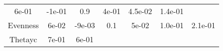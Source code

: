 \documentclass[12pt,]{article}
\begin{document}
\begin{longtable}[]{@{}ccccccc@{}}
\begin{minipage}[t]{0.09\columnwidth}
6e-01\strut
\end{minipage} & \begin{minipage}[t]{0.11\columnwidth}\centering\strut
-1e-01\strut
\end{minipage} & \begin{minipage}[t]{0.08\columnwidth}\centering\strut
0.9\strut
\end{minipage} & \begin{minipage}[t]{0.10\columnwidth}\centering\strut
4e-01\strut
\end{minipage} & \begin{minipage}[t]{0.07\columnwidth}\centering\strut
4.5e-02\strut
\end{minipage} & \begin{minipage}[t]{0.09\columnwidth}\centering\strut
1.4e-01\strut
\end{minipage}\tabularnewline
\begin{minipage}[t]{0.26\columnwidth}\centering\strut
Evenness\strut
\end{minipage} & \begin{minipage}[t]{0.09\columnwidth}\centering\strut
6e-02\strut
\end{minipage} & \begin{minipage}[t]{0.11\columnwidth}\centering\strut
-9e-03\strut
\end{minipage} & \begin{minipage}[t]{0.08\columnwidth}\centering\strut
0.1\strut
\end{minipage} & \begin{minipage}[t]{0.10\columnwidth}\centering\strut
5e-02\strut
\end{minipage} & \begin{minipage}[t]{0.07\columnwidth}\centering\strut
1.0e-01\strut
\end{minipage} & \begin{minipage}[t]{0.09\columnwidth}\centering\strut
2.1e-01\strut
\end{minipage}\tabularnewline
\begin{minipage}[t]{0.26\columnwidth}\centering\strut
Thetayc\strut
\end{minipage} & \begin{minipage}[t]{0.09\columnwidth}\centering\strut
7e-01\strut
\end{minipage} & \begin{minipage}[t]{0.11\columnwidth}\centering\strut
6e-01\strut
\end{minipage} & \begin{minipage}[t]{0.08\columnwidth}\centering\strut

\end{minipage}
\end{longtable}
\end{document}
